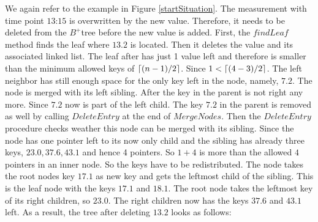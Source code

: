 \documentclass[abstracton,12pt]{scrreprt}
\DeclarePairedDelimiter\ceil{\lceil}{\rceil}
\begin{document}
\begin{exmp}
	We again refer to the example in Figure \ref{startSituation}. The measurement with time point $\text{13:15}$ is overwritten by the new value. Therefore, it needs to be deleted from the $B^+$tree before the new value is added. First, the $findLeaf$ method finds the leaf where $13.2$ is located. Then it deletes the value and its associated linked list. The leaf after has just 1 value left and therefore is smaller than the minimum allowed keys of $\ceil{(n-1)/2}$. Since $1<\ceil{(4-3)/2}$. The left neighbor has still enough space for the only key left in the node, namely, $7.2$. The node is merged with its left sibling. After the key in the parent is not right any more. Since $7.2$ now is part of the left child. The key $7.2$ in the parent is removed as well by calling $DeleteEntry$ at the end of $MergeNodes$. Then the $DeleteEntry$ procedure checks weather this node can be merged with its sibling. Since the node has one pointer left to its now only child and the sibling has already three keys, $23.0,37.6, 43.1$ and hence 4 pointers. So $1+4$ is more than the allowed $4$ pointers in an inner node. So the keys have to be redistributed. The node takes the root nodes key $17.1$ as new key and gets the leftmost child of the sibling. This is the leaf node with the keys $17.1$ and $18.1$. The root node takes the leftmost key of its right children, so $23.0$. The right children now has the keys $37.6$ and $43.1$ left. 
	As a result, the tree after deleting $13.2$ looks as follows: 
\end{exmp}
\end{document}
